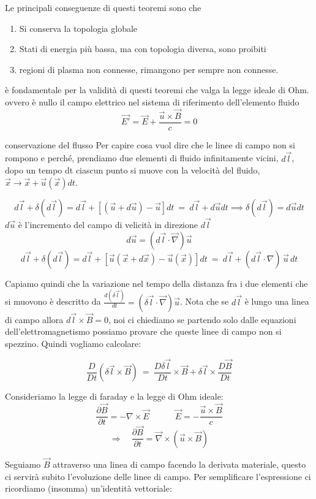 Le principali conseguenze di questi teoremi sono che 
\begin{enumerate}
	\item Si conserva la topologia globale
	\item Stati di energia più bassa, ma con topologia diversa, sono proibiti
	\item regioni di plasma non connesse, rimangono per sempre non connesse. 
\end{enumerate} 
è fondamentale per la validità di questi teoremi che valga la legge ideale di Ohm. 
ovvero  è nullo il campo elettrico nel sistema di riferimento dell'elemento fluido \[\vec {E'}=\vec E+\frac{\vec u\times \vec B}{c}=0\] 

\begin{teorema}{conservazione del flusso}{}
	Per capire cosa vuol dire che le linee di campo non si rompono e perché, prendiamo due elementi di fluido infinitamente vicini, $d\vec l$, dopo un tempo dt ciascun punto si muove con la velocità del fluido, $\vec x \rightarrow \vec x + \vec u(\vec x)dt$. 
	
	\[d\vec l+\delta (d\vec l)=d\vec l+ \left[ (\vec u+d\vec u)-\vec u \right] dt \ =\ d\vec l+d\vec udt\implies\delta(d\vec l)=d\vec udt\]  $d\vec u$ è l'incremento del campo di velicità in direzione $d\vec l$\[d\vec u=(d\vec l\cdot \vec \nabla)\vec u\] 
	\[d\vec l+\delta (d\vec l)=d\vec l+ \left[ \vec u(\vec x+d\vec x)-\vec u (\vec x)\right] dt \ =\ d\vec l+(d\vec l\cdot \nabla)\, \vec u\, dt \] 
	
	Capiamo quindi che la variazione nel tempo della distanza fra i due elementi che si muovono è descritto da $\frac{d(\delta\vec l)}{dt}=(\delta \vec l\cdot\vec \nabla)\vec u$. Nota che se $d\vec l$ è lungo una linea di campo allora $d\vec l \times \vec B = 0$, noi ci chiediamo se partendo solo dalle equazioni dell'elettromagnetismo possiamo provare che queste linee di campo non si spezzino.
	Quindi vogliamo calcolare: 
	
	\[\frac{D}{Dt}(\delta\vec l\times\vec B)\ =\ \frac{D\delta\vec l}{Dt}\times \vec B+\delta\vec l\times\frac{D\vec B}{Dt}\]
	
	Consideriamo la legge di faraday e la legge di Ohm ideale:
	\[ \frac{\partial\vec B}{\partial t} = -\nabla \times \vec E\quad \quad \quad \vec E = -\frac{\vec u \times \vec B}{c} \]
	\[\Rightarrow\quad \frac{\partial\vec B}{\partial t}=\vec \nabla\times(\vec u\times\vec B)\]
	
	Seguiamo $\vec B$ attraverso una linea di campo facendo la derivata materiale, questo ci servirà subito l'evoluzione delle linee di campo. Per semplificare l'espressione ci ricordiamo (insomma)  un'identità vettoriale:
	

\end{teorema}
